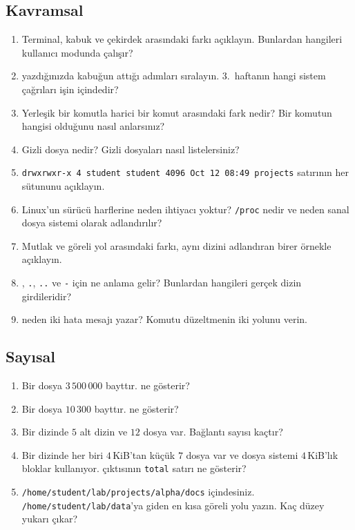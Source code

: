 \subsection*{Kavramsal}
\begin{enumerate}[leftmargin=1.6em]
  \item Terminal, kabuk ve çekirdek arasındaki farkı açıklayın. Bunlardan hangileri kullanıcı modunda çalışır?
  \item {} yazdığınızda kabuğun attığı adımları sıralayın. 3.\ haftanın hangi sistem çağrıları işin içindedir?
  \item Yerleşik bir komutla harici bir komut arasındaki fark nedir? Bir komutun hangisi olduğunu nasıl anlarsınız?
  \item Gizli dosya nedir? Gizli dosyaları nasıl listelersiniz?
  \item \texttt{drwxrwxr-x 4 student student 4096 Oct 12 08:49 projects} satırının her sütununu açıklayın.
  \item Linux'un sürücü harflerine neden ihtiyacı yoktur? \texttt{/proc} nedir ve neden sanal dosya sistemi olarak adlandırılır?
  \item Mutlak ve göreli yol arasındaki farkı, aynı dizini adlandıran birer örnekle açıklayın.
  \item \texttt{\tl}, \texttt{.}, \texttt{..} ve \texttt{-}  için ne anlama gelir? Bunlardan hangileri gerçek dizin girdileridir?
  \item {} neden iki hata mesajı yazar? Komutu düzeltmenin iki yolunu verin.
\end{enumerate}

\subsection*{Sayısal}
\begin{enumerate}[leftmargin=1.6em,resume]
  \item Bir dosya $3\,500\,000$ bayttır.  ne gösterir?
  \item Bir dosya $10\,300$ bayttır.  ne gösterir?
  \item Bir dizinde $5$ alt dizin ve $12$ dosya var. Bağlantı sayısı kaçtır?
  \item Bir dizinde her biri $4$\,KiB'tan küçük $7$ dosya var ve dosya sistemi $4$\,KiB'lık bloklar kullanıyor.  çıktısının \texttt{total} satırı ne gösterir?
  \item \texttt{/home/student/lab/projects/alpha/docs} içindesiniz. \texttt{/home/student/lab/data}'ya giden en kısa göreli yolu yazın. Kaç düzey yukarı çıkar?
\end{enumerate}

